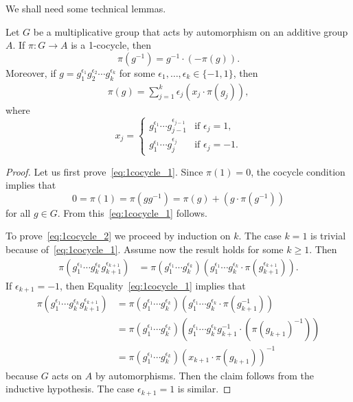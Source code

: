 We shall need some technical lemmas.

\begin{lemma}
Let $G$ be a multiplicative group that acts by automorphism on an additive 
group $A$. If $\pi\colon G\to A$ is a 1-cocycle, then
\begin{equation}
\label{eq:1cocycle_1}
    \pi(g^{-1})=g^{-1}\cdot (-\pi(g)).
\end{equation}
Moreover, if 
$g=g_1^{\epsilon_1}g_2^{\epsilon_2}\cdots g_k^{\epsilon_k}$ for some $\epsilon_1,\dots,\epsilon_k\in\{-1,1\}$, then 
\begin{align}
\label{eq:1cocycle_2}
\pi(g)=\sum_{j=1}^k\epsilon_j(x_j\cdot \pi(g_j)),
\end{align}
where 
\[
x_j=\begin{cases}
g_1^{\epsilon_1}\cdots g_{j-1}^{\epsilon_{j-1}} & \text{if $\epsilon_j=1$},\\
g_1^{\epsilon_1}\cdots g_{j}^{\epsilon_{j}} & \text{if $\epsilon_j=-1$}.
\end{cases}
\]
\end{lemma}

\begin{proof}
Let us first prove~\eqref{eq:1cocycle_1}. Since $\pi(1)=0$, the cocycle condition implies that 
\[
0=\pi(1)=\pi(gg^{-1})=\pi(g)+(g\cdot \pi(g^{-1}))
\]
for all $g\in G$. From this~\eqref{eq:1cocycle_1} follows.

To prove~\eqref{eq:1cocycle_2} we proceed by induction on $k$. 
The case $k=1$ is trivial because of~\eqref{eq:1cocycle_1}. Assume now the result holds for some $k\geq1$. 
Then 
\begin{align*}
\pi(g_1^{\epsilon_1}\cdots g_k^{\epsilon_k}g_{k+1}^{\epsilon_{k+1}})
&=\pi(g_1^{\epsilon_1}\cdots g_k^{\epsilon_k})(g_1^{\epsilon_1}\cdots g_k^{\epsilon_k}\cdot \pi(g_{k+1}^{\epsilon_{k+1}})).
\end{align*}
If $\epsilon_{k+1}=-1$, then Equality~\eqref{eq:1cocycle_1} implies that
\begin{align*}
\pi(g_1^{\epsilon_1}\cdots g_k^{\epsilon_k}g_{k+1}^{\epsilon_{k+1}})
&=\pi(g_1^{\epsilon_1}\cdots g_k^{\epsilon_k})(g_1^{\epsilon_1}\cdots g_k^{\epsilon_k}\cdot \pi(g_{k+1}^{-1}))\\
&=\pi(g_1^{\epsilon_1}\cdots g_k^{\epsilon_k})(g_1^{\epsilon_1}\cdots g_k^{\epsilon_k}g_{k+1}^{-1}\cdot (\pi(g_{k+1})^{-1}))\\
&=\pi(g_1^{\epsilon_1}\cdots g_k^{\epsilon_k})(x_{k+1}\cdot \pi(g_{k+1}))^{-1}
\end{align*}
because $G$ acts on $A$ by automorphisms. Then the claim follows from 
the inductive hypothesis. The case $\epsilon_{k+1}=1$ is similar. 
\end{proof}

